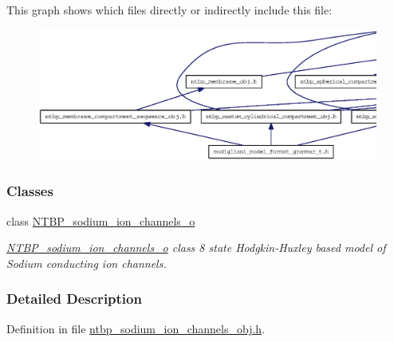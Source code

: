 This graph shows which files directly or indirectly include this file:
\nopagebreak
\begin{figure}[H]
\begin{center}
\leavevmode
\includegraphics[width=400pt]{ntbp__sodium__ion__channels__obj_8h__dep__incl}
\end{center}
\end{figure}
\subsubsection*{Classes}
\begin{DoxyCompactItemize}
\item 
class \hyperlink{class_n_t_b_p__sodium__ion__channels__o}{NTBP\_\-sodium\_\-ion\_\-channels\_\-o}
\begin{DoxyCompactList}\small\item\em \hyperlink{class_n_t_b_p__sodium__ion__channels__o}{NTBP\_\-sodium\_\-ion\_\-channels\_\-o} class 8 state Hodgkin-\/Huxley based model of Sodium conducting ion channels. \item\end{DoxyCompactList}\end{DoxyCompactItemize}


\subsubsection{Detailed Description}


Definition in file \hyperlink{ntbp__sodium__ion__channels__obj_8h_source}{ntbp\_\-sodium\_\-ion\_\-channels\_\-obj.h}.

